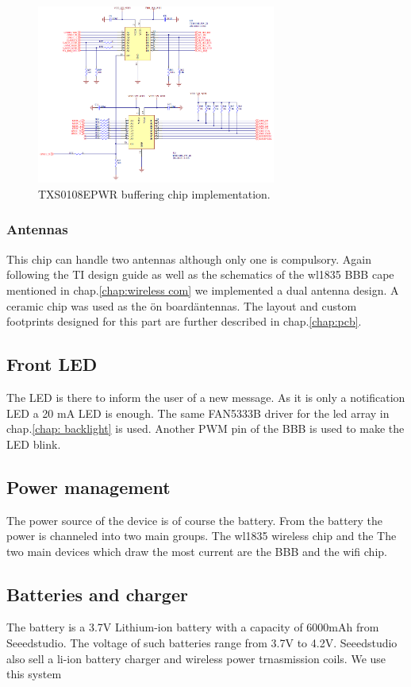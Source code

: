 \begin{figure}[!ht]
    \centering
    \includegraphics[width=0.7\textwidth,keepaspectratio]{chap/hardFig/wl_1835_buffer_sch}
    \caption{TXS0108EPWR buffering chip implementation.}
    \label{fig:buffering chip}
\end{figure}
\subsubsection{Antennas}
This chip can handle two antennas although only one is compulsory. Again following the TI design guide as well as the schematics of the wl1835 BBB cape mentioned in chap.\ref{chap:wireless com} we implemented a dual antenna design. A ceramic chip was used as the \"on board\" antennas. The layout and custom footprints designed for this part are further described in chap.\ref{chap:pcb}.
\subsection{Front LED}
The LED is there to inform the user of a new message. As it is only a notification LED a 20 mA LED is enough. The same FAN5333B driver for the led array in chap.\ref{chap: backlight} is used. Another PWM pin of the BBB is used to make the LED blink.
\subsection{Power management}
The power source of the device is of course the battery. From the battery the power is channeled into two main groups. The wl1835 wireless chip and the
The two main devices which draw the most current are the BBB and the wifi chip.
\subsection{Batteries and charger}
The battery is a 3.7V Lithium-ion battery with a capacity of 6000mAh from Seeedstudio. The voltage of such batteries range from 3.7V to 4.2V. Seeedstudio also sell a li-ion battery charger and wireless power trnasmission coils. We use this system
